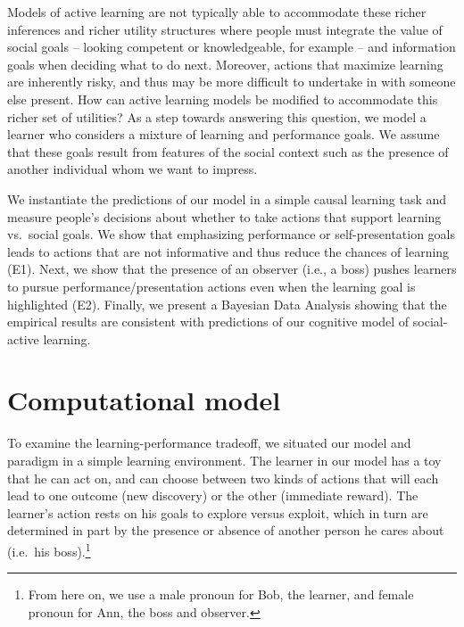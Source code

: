 \documentclass[10pt, letterpaper]{article}
\begin{document}
Models of active learning are not typically able to accommodate these
richer inferences and richer utility structures where people must
integrate the value of social goals -- looking competent or
knowledgeable, for example -- and information goals when deciding what
to do next. Moreover, actions that maximize learning are inherently
risky, and thus may be more difficult to undertake in with someone else
present. How can active learning models be modified to accommodate this
richer set of utilities? As a step towards answering this question, we
model a learner who considers a mixture of learning and performance
goals. We assume that these goals result from features of the social
context such as the presence of another individual whom we want to
impress.

We instantiate the predictions of our model in a simple causal learning
task and measure people's decisions about whether to take actions that
support learning vs.~social goals. We show that emphasizing performance
or self-presentation goals leads to actions that are not informative and
thus reduce the chances of learning (E1). Next, we show that the
presence of an observer (i.e., a boss) pushes learners to pursue
performance/presentation actions even when the learning goal is
highlighted (E2). Finally, we present a Bayesian Data Analysis showing
that the empirical results are consistent with predictions of our
cognitive model of social-active learning.

\section{Computational model}\label{computational-model}

To examine the learning-performance tradeoff, we situated our model and
paradigm in a simple learning environment. The learner in our model has
a toy that he can act on, and can choose between two kinds of actions
that will each lead to one outcome (new discovery) or the other
(immediate reward). The learner's action rests on his goals to explore
versus exploit, which in turn are determined in part by the presence or
absence of another person he cares about (i.e.~his
boss).\footnote{From here on, we use a male pronoun for Bob, the learner, and female pronoun for Ann, the boss and observer.}
\end{document}
